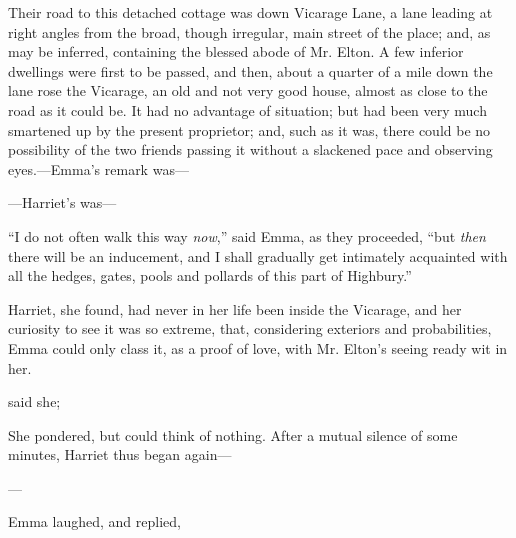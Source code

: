 Their road to this detached cottage was down Vicarage Lane, a lane leading at right angles from the broad, though irregular, main street of the place; and, as may be inferred, containing the blessed abode of Mr. Elton. A few inferior dwellings were first to be passed, and then, about a quarter of a mile down the lane rose the Vicarage, an old and not very good house, almost as close to the road as it could be. It had no advantage of situation; but had been very much smartened up by the present proprietor; and, such as it was, there could be no possibility of the two friends passing it without a slackened pace and observing eyes.---Emma's remark was---

---Harriet's was---


“I do not often walk this way {\em now},” said Emma, as they proceeded, “but {\em then} there will be an inducement, and I shall gradually get intimately acquainted with all the hedges, gates, pools and pollards of this part of Highbury.”

Harriet, she found, had never in her life been inside the Vicarage, and her curiosity to see it was so extreme, that, considering exteriors and probabilities, Emma could only class it, as a proof of love, with Mr. Elton's seeing ready wit in her.

 said she; 

She pondered, but could think of nothing. After a mutual silence of some minutes, Harriet thus began again---

---

Emma laughed, and replied,



